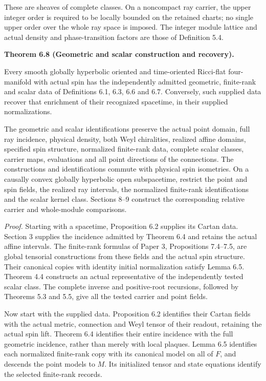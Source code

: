 \documentclass[
  english,
  11pt,
  reqno]{amsart}
\makeatletter
\newcommand{\pandocstatementheading}[1]{%
  \par\addpenalty{\@beginparpenalty}%
  \addvspace{.5\baselineskip plus .2\baselineskip minus .2\baselineskip}%
  {\normalfont\bfseries #1\par}%
  \nobreak\@afterindenttrue\@afterheading
}
\makeatother
\begin{document}
These are sheaves of complete classes. On a noncompact ray carrier, the
upper integer order is required to be locally bounded on the retained
charts; no single upper order over the whole ray space is imposed. The
integer module lattice and actual density and phase-transition factors
are those of Definition 5.4.

\pandocstatementheading{\protect{}\label{thm:global-geometric-scalar-recovery}Theorem 6.8 (Geometric and scalar construction and recovery).}

Every smooth globally hyperbolic oriented and time-oriented Ricci-flat
four-manifold with actual spin has the independently admitted geometric,
finite-rank and scalar data of Definitions 6.1, 6.3, 6.6 and 6.7.
Conversely, such supplied data recover that enrichment of their
recognized spacetime, in their supplied normalizations.

The geometric and scalar identifications preserve the actual point
domain, full ray incidence, physical density, both Weyl chiralities,
realized affine domains, specified spin structure, normalized
finite-rank data, complete scalar classes, carrier maps, evaluations and
all point directions of the connections. The constructions and
identifications commute with physical spin isometries. On a causally
convex globally hyperbolic open subspacetime, restrict the point and
spin fields, the realized ray intervals, the normalized finite-rank
identifications and the scalar kernel class. Sections 8--9 construct the
corresponding relative carrier and whole-module comparisons.

\emph{Proof.} Starting with a spacetime, Proposition 6.2 supplies its
Cartan data. Section 3 supplies the incidence admitted by Theorem 6.4
and retains the actual affine intervals. The finite-rank formulas of
Paper 3, Propositions 7.4--7.5, are global tensorial constructions from
these fields and the actual spin structure. Their canonical copies with
identity initial normalization satisfy Lemma 6.5. Theorem 4.4 constructs
an actual representative of the independently tested scalar class. The
complete inverse and positive-root recursions, followed by Theorems 5.3
and 5.5, give all the tested carrier and point fields.

Now start with the supplied data. Proposition 6.2 identifies their
Cartan fields with the actual metric, connection and Weyl tensor of
their readout, retaining the actual spin lift. Theorem 6.4 identifies
their entire incidence with the full geometric incidence, rather than
merely with local plaques. Lemma 6.5 identifies each normalized
finite-rank copy with its canonical model on all of \(F\), and descends
the point models to \(M\). Its initialized tensor and state equations
identify the selected finite-rank records.
\end{document}
